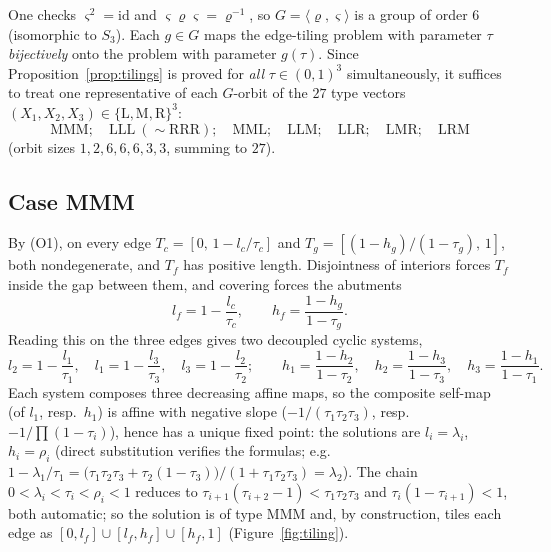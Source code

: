 \documentclass[11pt,reqno]{amsart}
\theoremstyle{plain}
\theoremstyle{definition}
\theoremstyle{remark}
\begin{document}
One checks $\varsigma^2=\mathrm{id}$ and
$\varsigma\varrho\varsigma=\varrho^{-1}$, so
$G=\langle\varrho,\varsigma\rangle$ is a group of order $6$ (isomorphic to
$S_3$). Each $g\in G$ maps the edge-tiling problem with parameter $\tau$
\emph{bijectively} onto the problem with parameter $g(\tau)$. Since
Proposition~\ref{prop:tilings} is proved for \emph{all} $\tau\in(0,1)^3$
simultaneously, it suffices to treat one representative of each $G$-orbit of
the $27$ type vectors $(X_1,X_2,X_3)\in\{\mathrm L,\mathrm M,\mathrm R\}^3$:
\[
\mathrm{MMM};\quad \mathrm{LLL}\ (\sim\mathrm{RRR});\quad \mathrm{MML};\quad
\mathrm{LLM};\quad \mathrm{LLR};\quad \mathrm{LMR};\quad \mathrm{LRM}
\]
(orbit sizes $1,2,6,6,6,3,3$, summing to $27$).

\subsection*{Case MMM}
By (O1), on every edge $T_c=[0,\,1-l_c/\tau_c]$ and
$T_g=[(1-h_g)/(1-\tau_g),\,1]$, both nondegenerate, and $T_f$ has positive
length. Disjointness of interiors forces $T_f$ inside the gap between them, and
covering forces the abutments
\[
l_f=1-\frac{l_c}{\tau_c},\qquad h_f=\frac{1-h_g}{1-\tau_g}.
\]
Reading this on the three edges gives two decoupled cyclic systems,
\[
l_2=1-\frac{l_1}{\tau_1},\quad l_1=1-\frac{l_3}{\tau_3},\quad
l_3=1-\frac{l_2}{\tau_2};
\qquad
h_1=\frac{1-h_2}{1-\tau_2},\quad h_2=\frac{1-h_3}{1-\tau_3},\quad
h_3=\frac{1-h_1}{1-\tau_1}.
\]
Each system composes three decreasing affine maps, so the composite self-map
(of $l_1$, resp.\ $h_1$) is affine with negative slope
($-1/(\tau_1\tau_2\tau_3)$, resp.\ $-1/\prod(1-\tau_i)$), hence has a unique
fixed point: the solutions are $l_i=\lambda_i$, $h_i=\rho_i$ (direct
substitution verifies the formulas; e.g.\
$1-\lambda_1/\tau_1
=\bigl(\tau_1\tau_2\tau_3+\tau_2(1-\tau_3)\bigr)/(1+\tau_1\tau_2\tau_3)
=\lambda_2$). The chain
$0<\lambda_i<\tau_i<\rho_i<1$ reduces to
$\tau_{i+1}(\tau_{i+2}-1)<\tau_1\tau_2\tau_3$ and $\tau_i(1-\tau_{i+1})<1$,
both automatic; so the solution is of type MMM and, by construction, tiles each
edge as $[0,l_f]\cup[l_f,h_f]\cup[h_f,1]$ (Figure~\ref{fig:tiling}).
\end{document}
